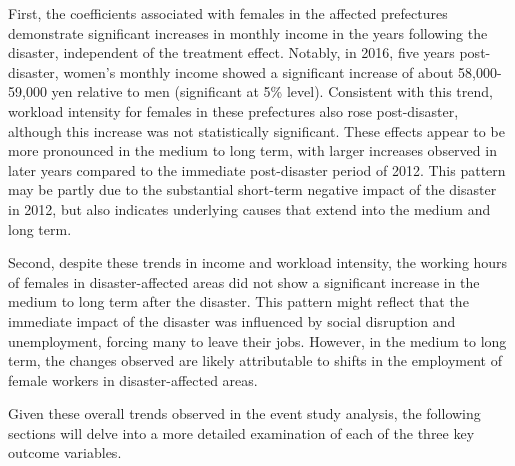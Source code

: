 \documentclass[a4paper,12pt]{article}
\begin{document}
First, the coefficients associated with females in the affected prefectures demonstrate significant increases in monthly income in the years following the disaster, independent of the treatment effect. Notably, in 2016, five years post-disaster, women's monthly income showed a significant increase of about 58,000-59,000 yen relative to men (significant at 5\% level). Consistent with this trend, workload intensity for females in these prefectures also rose post-disaster, although this increase was not statistically significant. These effects appear to be more pronounced in the medium to long term, with larger increases observed in later years compared to the immediate post-disaster period of 2012. This pattern may be partly due to the substantial short-term negative impact of the disaster in 2012, but also indicates underlying causes that extend into the medium and long term.

Second, despite these trends in income and workload intensity, the working hours of females in disaster-affected areas did not show a significant increase in the medium to long term after the disaster. This pattern might reflect that the immediate impact of the disaster was influenced by social disruption and unemployment, forcing many to leave their jobs. However, in the medium to long term, the changes observed are likely attributable to shifts in the employment of female workers in disaster-affected areas.


Given these overall trends observed in the event study analysis, the following sections will delve into a more detailed examination of each of the three key outcome variables.









\end{document}
